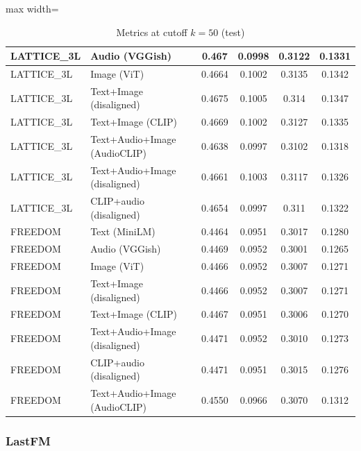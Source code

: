 \begin{table}[H]
\begin{adjustbox}{max width=\textwidth}
\begin{tabular}{|l|l|c|c|c|c|}
    \hline
    LATTICE\_3L & Audio (VGGish) & 0.467 & 0.0998 & 0.3122 & 0.1331 \\
    \hline
    LATTICE\_3L & Image (ViT) & 0.4664 & 0.1002 & 0.3135 & 0.1342 \\
    \hline
    LATTICE\_3L & Text+Image (disaligned) & 0.4675 & 0.1005 & 0.314 & 0.1347 \\
    \hline
    LATTICE\_3L & Text+Image (CLIP) & 0.4669 & 0.1002 & 0.3127 & 0.1335 \\
    \hline
    LATTICE\_3L & Text+Audio+Image (AudioCLIP) & 0.4638 & 0.0997 & 0.3102 & 0.1318 \\
    \hline
    LATTICE\_3L & Text+Audio+Image (disaligned) & 0.4661 & 0.1003 & 0.3117 & 0.1326 \\
    \hline
    LATTICE\_3L & CLIP+audio (disaligned) & 0.4654 & 0.0997 & 0.311 & 0.1322 \\
    \hline
    FREEDOM & Text (MiniLM) & 0.4464 & 0.0951 & 0.3017 & 0.1280 \\
    \hline
    FREEDOM & Audio (VGGish) & 0.4469 & 0.0952 & 0.3001 & 0.1265 \\
    \hline
    FREEDOM & Image (ViT) & 0.4466 & 0.0952 & 0.3007 & 0.1271 \\
    \hline
    FREEDOM & Text+Image (disaligned) & 0.4466 & 0.0952 & 0.3007 & 0.1271 \\
    \hline
    FREEDOM & Text+Image (CLIP) & 0.4467 & 0.0951 & 0.3006 & 0.1270 \\
    \hline
    FREEDOM & Text+Audio+Image (disaligned) & 0.4471 & 0.0952 & 0.3010 & 0.1273 \\
    \hline
    FREEDOM & CLIP+audio (disaligned) & 0.4471 & 0.0951 & 0.3015 & 0.1276 \\
    \hline
    FREEDOM & Text+Audio+Image (AudioCLIP) & 0.4550 & 0.0966 & 0.3070 & 0.1312 \\
    \hline
    \end{tabular}
    \end{adjustbox}
    \caption{Metrics at cutoff $k=50$ (test)}
    \label{tab:metrics_k50}
\end{table}

\subsubsection{LastFM}

